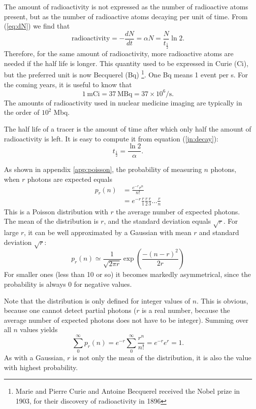 \documentclass[11pt,oneside]{book}
\begin{document}
The amount of radioactivity is not expressed as the number of
radioactive atoms present, but as the number of radioactive atoms
decaying per unit of time. From (\ref{eq:dN}) we find that
\begin{equation}
  \mbox{radioactivity} = -\frac{dN}{dt} = \alpha N =
  \frac{N}{t_{\frac{1}{2}}} \ln 2.
\end{equation}
Therefore, for the same amount of radioactivity, more radioactive
atoms are needed if the half life is longer.  This quantity used to be
expressed in Curie (Ci), but the preferred unit is now Becquerel (Bq)
\footnote{Marie and Pierre Curie and Antoine Becquerel received the
Nobel prize in 1903, for their discovery of radioactivity in 1896}.
One Bq means 1 event per s. For the coming years, it is useful to know
that
\begin{equation}
 1 \ \mbox{mCi} = 37 \ \mbox{MBq} = 37 \times 10^{6} / \mbox{s}.
\end{equation}
The amounts of radioactivity used in nuclear medicine imaging are
typically in the order of $10^2$ Mbq.

The half life of a tracer is the amount of time after which only half the
amount of radioactivity is left. It is easy to compute it from equation
(\ref{jn:decay}):
\begin{equation}
 t_{\frac{1}{2}}  = \frac{\ln 2}{\alpha} .
\end{equation}

As shown in appendix \ref{app:poisson}, the probability of measuring $n$
photons, when $r$ photons are expected equals
\begin{align}
  p_r(n) &= \frac{e^{-r} r^n}{n!} \label{jn:Poisson} \\
         &= e^{-r} \frac{r}{1} \frac{r}{2} \frac{r}{3} \ldots \frac{r}{n}
\end{align}
This is a Poisson distribution with $r$ the average number of expected
photons. The mean of the distribution is $r$, and the standard
deviation equals $\sqrt{r}$. For large $r$, it can be well
approximated by a Gaussian with mean $r$ and standard deviation
$\sqrt{r}$:
\begin{equation}
  p_r(n) \simeq \frac{1}{\sqrt{2 \pi r}} \exp \left( \frac{- (n - r)^2}{2 r} 
  \right)
\end{equation} For smaller ones (less than 10 or so) it becomes markedly
asymmetrical, since the
probability is always $0$ for negative values.

Note that the distribution is only defined for integer values of $n$. This is
obvious, because one cannot detect partial photons ($r$ is a real number,
because the average number of expected photons does not have to be integer).
Summing over all $n$ values yields
\begin{equation}
 \sum_0^\infty p_r(n) = e^{-r} \sum_0^\infty \frac{r^n}{n!}
  = e^{-r} e^{r} = 1.
\end{equation}
As with a Gaussian, $r$ is not only the mean of the distribution, it is also
the value with highest probability.
\end{document}
